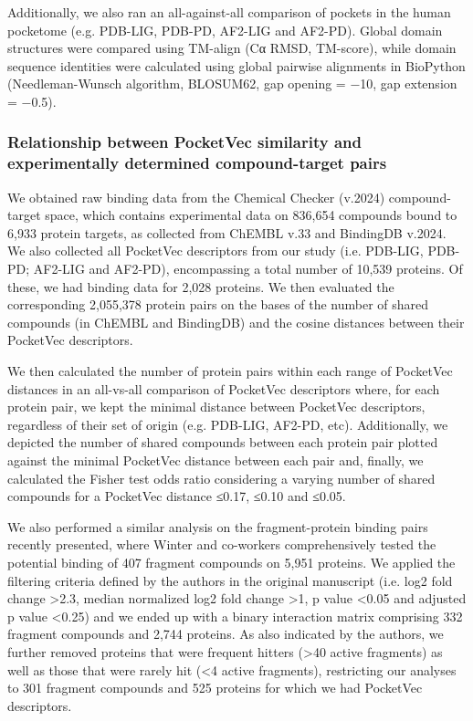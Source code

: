 Additionally, we also ran an all-against-all comparison of pockets in the human pocketome (e.g. PDB-LIG, PDB-PD, AF2-LIG and AF2-PD). Global domain structures were compared using TM-align\cite{zhang_tm-align_2005} (Cα RMSD, TM-score), while domain sequence identities were calculated using global pairwise alignments in BioPython\cite{cock_biopython_2009} (Needleman-Wunsch algorithm, BLOSUM62, gap opening = −10, gap extension = −0.5). 

\subsubsection{Relationship between PocketVec similarity and experimentally determined compound-target pairs}

We obtained raw binding data from the Chemical Checker (v.2024) compound-target space\cite{duran-frigola_extending_2020}, which contains experimental data on 836,654 compounds bound to 6,933 protein targets, as collected from ChEMBL v.33\cite{zdrazil_chembl_2024} and BindingDB v.2024\cite{gilson_bindingdb_2016}. We also collected all PocketVec descriptors from our study (i.e. PDB-LIG, PDB-PD; AF2-LIG and AF2-PD), encompassing a total number of 10,539 proteins. Of these, we had binding data for 2,028 proteins. We then evaluated the corresponding 2,055,378 protein pairs on the bases of the number of shared compounds (in ChEMBL and BindingDB) and the cosine distances between their PocketVec descriptors.

We then calculated the number of protein pairs within each range of PocketVec distances in an all-vs-all comparison of PocketVec descriptors where, for each protein pair, we kept the minimal distance between PocketVec descriptors, regardless of their set of origin (e.g. PDB-LIG, AF2-PD, etc). Additionally, we depicted the number of shared compounds between each protein pair plotted against the minimal PocketVec distance between each pair and, finally, we calculated the Fisher test odds ratio considering a varying number of shared compounds for a PocketVec distance ≤0.17, ≤0.10 and ≤0.05.

We also performed a similar analysis on the fragment-protein binding pairs recently presented\cite{offensperger_large-scale_2024}, where Winter and co-workers comprehensively tested the potential binding of 407 fragment compounds on 5,951 proteins. We applied the filtering criteria defined by the authors in the original manuscript (i.e. log2 fold change >2.3, median normalized log2 fold change >1, p value <0.05 and adjusted p value <0.25) and we ended up with a binary interaction matrix comprising 332 fragment compounds and 2,744 proteins. As also indicated by the authors, we further removed proteins that were frequent hitters (>40 active fragments) as well as those that were rarely hit (<4 active fragments), restricting our analyses to 301 fragment compounds and 525 proteins for which we had PocketVec descriptors. 


